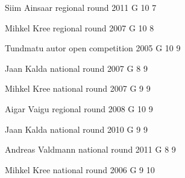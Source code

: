 \documentclass[11pt]{article}
\begin{document}
\ylDisplay{} %
{Siim Ainsaar} %
{regional round} %
{2011} %
{G 10} %
{7} %
{

\ifEngStatement
\fi
}

\ylDisplay{} %
{Mihkel Kree} %
{regional round} %
{2007} %
{G 10} %
{8} %
{

\ifEngStatement
\fi
}

\ylDisplay{} %
{Tundmatu autor} %
{open competition} %
{2005} %
{G 10} %
{9} %
{

\ifEngStatement
\fi
}

\ylDisplay{} %
{Jaan Kalda} %
{national round} %
{2007} %
{G 8} %
{9} %
{

\ifEngStatement
\fi
}

\ylDisplay{} %
{Mihkel Kree} %
{national round} %
{2007} %
{G 9} %
{9} %
{

\ifEngStatement
\fi
}

\ylDisplay{} %
{Aigar Vaigu} %
{regional round} %
{2008} %
{G 10} %
{9} %
{

\ifEngStatement
\fi
}

\ylDisplay{} %
{Jaan Kalda} %
{national round} %
{2010} %
{G 9} %
{9} %
{

\ifEngStatement
\fi
}

\ylDisplay{} %
{Andreas Valdmann} %
{national round} %
{2011} %
{G 8} %
{9} %
{

\ifEngStatement
\fi
}

\ylDisplay{} %
{Mihkel Kree} %
{national round} %
{2006} %
{G 9} %
{10} %
{

\ifEngStatement
\fi
}
\newpage\subsection{\protect{}}
\end{document}
